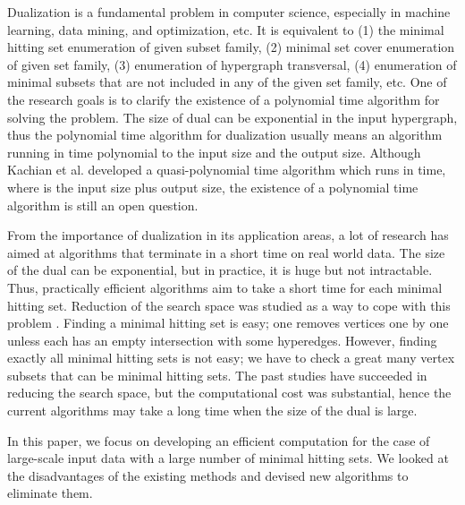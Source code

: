Dualization is a fundamental problem in computer science, especially in
 machine learning, data mining, and optimization, etc.
It is equivalent to (1) the minimal hitting set enumeration of given
 subset family,
 (2) minimal set cover enumeration of given set family,
 (3) enumeration of hypergraph transversal,
 (4) enumeration of minimal subsets that are not included in any of the
  given set family, etc.
One of the research goals is to clarify the existence of a polynomial
 time algorithm for solving the problem.
The size of dual can be exponential in the input hypergraph, thus the
 polynomial time algorithm for dualization usually means an algorithm
 running in time polynomial to the input size and the output size.
Although Kachian et al.\cite{FrKc96} developed a quasi-polynomial
 time algorithm which runs in  time, where  is the
 input size plus output size, the existence of a polynomial time algorithm
 is still an open question.

From the importance of dualization in its application areas, a lot of
 research has aimed at algorithms that terminate in a short time on real
 world data.
The size of the dual can be exponential, but in practice, it is huge but
 not intractable.
Thus, practically efficient algorithms aim to take a short time for
 each minimal hitting set.
Reduction of the search space was studied as a way to cope with this problem
 \cite{DgLj05,FrKc96,HcBa07,KvSt99,IBE,IBE2}.
Finding a minimal hitting set is easy; one removes vertices one by one
 unless each has an empty intersection with some hyperedges.
However, finding exactly all minimal hitting sets is not easy; we have
 to check a great many vertex subsets that can be minimal hitting sets.
The past studies have succeeded in reducing the search space,
 but the computational cost was substantial, hence the current algorithms
 may take a long time when the size of the dual is large.

In this paper, we focus on developing an efficient computation for the case
 of large-scale input data with a large number of minimal hitting sets.
We looked at the disadvantages of the existing methods and
 devised new algorithms to eliminate them.
 
